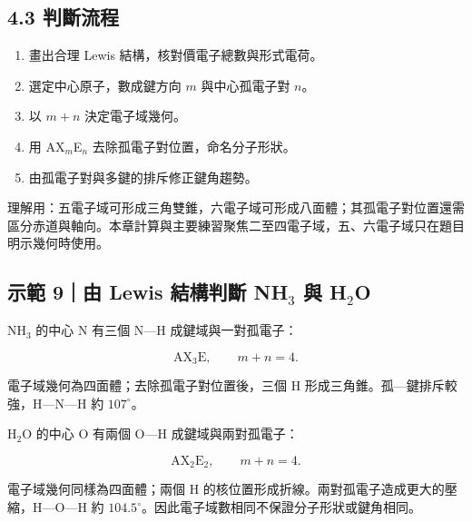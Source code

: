 \documentclass[11pt,a4paper]{article}
\providecommand{\tightlist}{%
  \setlength{\itemsep}{0pt}\setlength{\parskip}{0pt}}
\begin{document}
\subsection{4.3 判斷流程}\label{ux5224ux65b7ux6d41ux7a0b}

\begin{enumerate}
\def\labelenumi{\arabic{enumi}.}
\tightlist
\item
  畫出合理 Lewis 結構，核對價電子總數與形式電荷。
\item
  選定中心原子，數成鍵方向 \(m\) 與中心孤電子對 \(n\)。
\item
  以 \(m+n\) 決定電子域幾何。
\item
  用 AX\(_m\)E\(_n\) 去除孤電子對位置，命名分子形狀。
\item
  由孤電子對與多鍵的排斥修正鍵角趨勢。
\end{enumerate}

理解用：五電子域可形成三角雙錐，六電子域可形成八面體；其孤電子對位置還需區分赤道與軸向。本章計算與主要練習聚焦二至四電子域，五、六電子域只在題目明示幾何時使用。

\begin{HandoutWorkedExample}

\subsection{\texorpdfstring{示範 9｜由 Lewis 結構判斷 NH\(_3\) 與 H\(_2\)O}{示範 9｜由 Lewis 結構判斷 NH\_3 與 H\_2O}}\label{ux793aux7bc4-9ux7531-lewis-ux7d50ux69cbux5224ux65b7-nh_3-ux8207-h_2o}

NH\(_3\) 的中心 N 有三個 N---H 成鍵域與一對孤電子：

\[
\mathrm{AX_3E},\qquad m+n=4.
\]

電子域幾何為四面體；去除孤電子對位置後，三個 H 形成三角錐。孤---鍵排斥較強，H---N---H 約 \(107^\circ\)。

H\(_2\)O 的中心 O 有兩個 O---H 成鍵域與兩對孤電子：

\[
\mathrm{AX_2E_2},\qquad m+n=4.
\]

電子域幾何同樣為四面體；兩個 H 的核位置形成折線。兩對孤電子造成更大的壓縮，H---O---H 約 \(104.5^\circ\)。因此電子域數相同不保證分子形狀或鍵角相同。

\end{HandoutWorkedExample}
\end{document}

